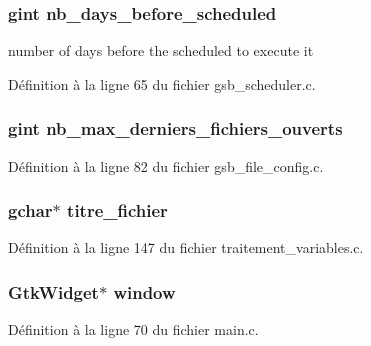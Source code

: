 \subsubsection[{nb\_\-days\_\-before\_\-scheduled}]{\setlength{\rightskip}{0pt plus 5cm}gint {\bf nb\_\-days\_\-before\_\-scheduled}}\label{parametres_8c_ab4baae80534027ea3fe73d417c48caaa}
number of days before the scheduled to execute it 

Définition à la ligne 65 du fichier gsb\_\-scheduler.c.

\subsubsection[{nb\_\-max\_\-derniers\_\-fichiers\_\-ouverts}]{\setlength{\rightskip}{0pt plus 5cm}gint {\bf nb\_\-max\_\-derniers\_\-fichiers\_\-ouverts}}\label{parametres_8c_a691d56f7a427c60a7714f6bec232807b}


Définition à la ligne 82 du fichier gsb\_\-file\_\-config.c.

\subsubsection[{titre\_\-fichier}]{\setlength{\rightskip}{0pt plus 5cm}gchar$\ast$ {\bf titre\_\-fichier}}\label{parametres_8c_a787cc81cf2ad728775b73d723713980b}


Définition à la ligne 147 du fichier traitement\_\-variables.c.

\subsubsection[{window}]{\setlength{\rightskip}{0pt plus 5cm}GtkWidget$\ast$ {\bf window}}\label{parametres_8c_a3d346c08cf2d67c388caabffb412b293}


Définition à la ligne 70 du fichier main.c.

